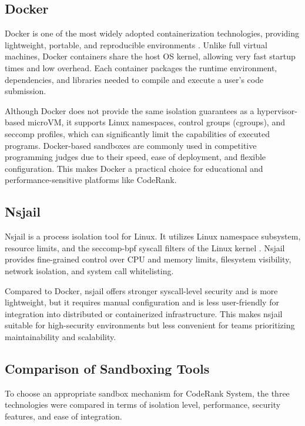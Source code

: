 \subsection{Docker}
Docker is one of the most widely adopted containerization technologies, providing lightweight, portable, and reproducible environments \cite{docker2025}. Unlike full virtual machines, Docker containers share the host OS kernel, allowing very fast startup times and low overhead. Each container packages the runtime environment, dependencies, and libraries needed to compile and execute a user's code submission. 

Although Docker does not provide the same isolation guarantees as a hypervisor-based microVM, it supports Linux namespaces, control groups (cgroups), and seccomp profiles, which can significantly limit the capabilities of executed programs. Docker-based sandboxes are commonly used in competitive programming judges due to their speed, ease of deployment, and flexible configuration. This makes Docker a practical choice for educational and performance-sensitive platforms like CodeRank.

\subsection{Nsjail}
Nsjail is a process isolation tool for Linux. It utilizes Linux namespace subsystem, resource limits, and the seccomp-bpf syscall filters of the Linux kernel \cite{nsjail2025}. Nsjail provides fine-grained control over CPU and memory limits, filesystem visibility, network isolation, and system call whitelisting.  

Compared to Docker, nsjail offers stronger syscall-level security and is more lightweight, but it requires manual configuration and is less user-friendly for integration into distributed or containerized infrastructure. This makes nsjail suitable for high-security environments but less convenient for teams prioritizing maintainability and scalability.

\subsection{Comparison of Sandboxing Tools}
To choose an appropriate sandbox mechanism for CodeRank System, the three technologies were compared in terms of isolation level, performance, security features, and ease of integration.

